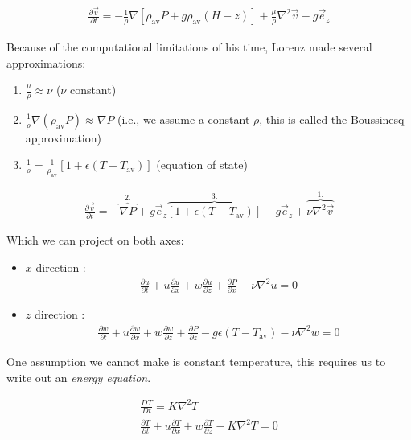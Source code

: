 \begin{align*}
    \frac{\partial \vec{v}}{ \partial t} = - \frac{1}{\rho} \nabla \left[ \rho_\text{av} P + g \rho_\text{av} (H-z) \right] + \frac{\mu}{\rho} \nabla^2 \vec{v} - g \vec{e}_z 
\end{align*}

Because of the computational limitations of his time, Lorenz made several approximations:

\begin{enumerate}
    \item $\frac{\mu}{\rho} \approx \nu$ ($\nu$ constant)
    \item $\frac{1}{\rho} \nabla (\rho_\text{av} P) \approx \nabla P$ (i.e., we assume a constant $\rho$, this is called the Boussinesq approximation)
    \item $\frac{1}{\rho} = \frac{1}{\rho_\text{av}} \left[ 1 + \epsilon (T-T_\text{av}) \right]$ (equation of state)
\end{enumerate}

\begin{align*}
    \frac{\partial \vec{v}}{ \partial t} = - \overbrace{\nabla P}^{2.} + g \vec{e}_z \overbrace{ \left[1 + \epsilon (T-T_\text{av})\right]}^{3.} - g \vec{e}_z + \overbrace{\nu \nabla^2 \vec{v}}^{1.}
\end{align*}

Which we can project on both axes:
\begin{itemize}
    \item $x$ direction :
        \begin{align}
            \frac{\partial u }{\partial t} + u \frac{\partial u }{\partial x} + w \frac{\partial u }{\partial z} + \frac{\partial P }{\partial x} - \nu \nabla^2 u = 0 \tag{2}  
        \end{align}
    \item $z$ direction :
        \begin{align*}
            \frac{\partial w }{\partial t} + u \frac{\partial w }{\partial x} + w \frac{\partial w }{\partial z} + \frac{\partial P }{\partial z} - g \epsilon (T-T_\text{av}) - \nu \nabla^2 w = 0 \tag{3}
        \end{align*}
\end{itemize}

One assumption we cannot make is constant temperature, this requires us to write out an \textit{energy equation}.

\begin{align*}
    \frac{D T }{D t} = K \nabla^2 T  \\
    \frac{\partial T }{\partial t} + u \frac{\partial T }{\partial x} + w \frac{\partial T }{\partial z} - K \nabla^2 T  = 0 \tag{4}
\end{align*}

